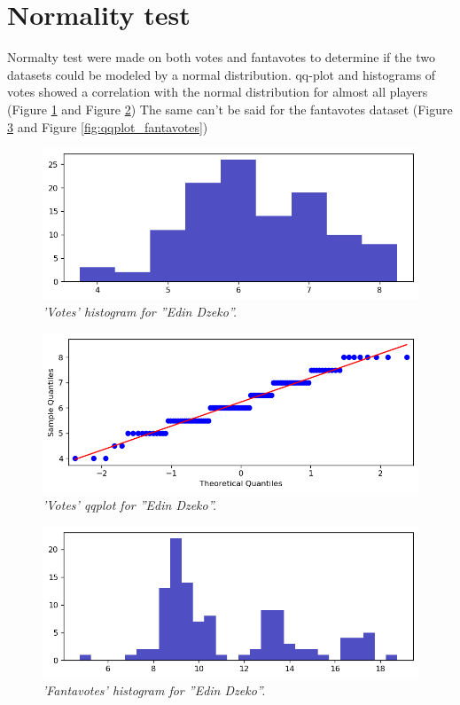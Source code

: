 \section{Normality test}

Normalty test were made on both votes and fantavotes to determine if the two datasets could be modeled by a normal distribution.
qq-plot and histograms of votes showed a correlation with the normal distribution for almost all players  (Figure \ref{fig:hist_votes} and Figure \ref{fig:qqplot_votes})
The same can't be said for the fantavotes dataset (Figure \ref{fig:hist_fantavotes} and Figure \ref{fig:qqplot_fantavotes})

\begin{figure}[H]
  \includegraphics[scale=0.5]{images/dzeko_normality_test_voti_barchart.png}
   \caption{\textit{'Votes' histogram for ''Edin Dzeko''.}}
  \label{fig:hist_votes}
\end{figure}

\begin{figure}[H]
  \includegraphics[scale=0.5]{images/dzeko_normality_test_voti_qqplot.png}
   \caption{\textit{'Votes' qqplot for ''Edin Dzeko''.}}
  \label{fig:qqplot_votes}
\end{figure}

\begin{figure}[H]
  \includegraphics[scale=0.5]{images/dzeko_normality_test_fantavoti_barchart.png}
   \caption{\textit{'Fantavotes' histogram for ''Edin Dzeko''.}}
  \label{fig:hist_fantavotes}
\end{figure}

